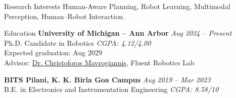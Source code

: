 \documentclass{resume}
\begin{document}
\begin{rSection}{Research Interests}
Human-Aware Planning, Robot Learning, Multimodal Perception, Human--Robot Interaction.
\end{rSection}

\begin{rSection}{Education}
{\bf University of Michigan -- Ann Arbor} \hfill {\em Aug 2024 -- Present}
\\ Ph.D. Candidate in Robotics \hfill {\em CGPA: 4.12/4.00}
\\ Expected graduation: Aug 2029
\\ Advisor: \href{https://chrismavrogiannis.com/}{Dr. Christoforos Mavrogiannis}, Fluent Robotics Lab

{\bf BITS Pilani, K. K. Birla Goa Campus} \hfill {\em Aug 2019 -- Mar 2023}
\\ B.E. in Electronics and Instrumentation Engineering \hfill {\em CGPA: 8.58/10}
\end{rSection}
\end{document}

